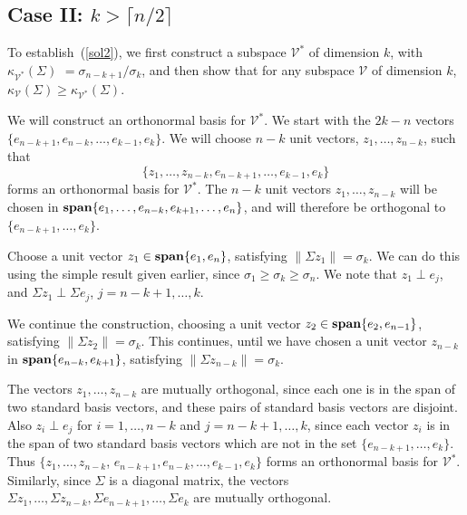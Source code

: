 \documentclass[12pt]{article}
\newcommand{\Span}{\mathop{\bf span}}%
\begin{document}
\subsection{Case II: $k > \lceil n/2 \rceil$}
To establish~(\ref{sol2}), we first construct a subspace
$\mathcal V^*$ of dimension $k$, with
$\kappa_{\mathcal V^*}(\Sigma)$ $=\sigma_{n-k+1} / \sigma_k$, and
then show that for any subspace $\mathcal V$ of dimension $k$,
$\kappa_{\mathcal V}(\Sigma) \geq \kappa_{\mathcal V^*}(\Sigma)$.

We will construct an orthonormal basis for $\mathcal V^*$. 
We start with the $2k-n$ vectors
$\{ e_{n-k+1}, e_{n-k}, \ldots, e_{k-1}, e_{k} \}$.
We will choose $n-k$ unit vectors, $z_1, \ldots, z_{n-k}$,
such that
\[
\{ z_1, \ldots, z_{n-k}, e_{n-k+1},  \ldots, e_{k-1},e_{k} \}
\] 
forms an orthonormal basis for $\mathcal V^*$. 
The $n-k$ unit vectors $z_1, \ldots, z_{n-k}$ will be chosen in
$\Span \{ e_{1}, \ldots, e_{n-k},
e_{k+1}, \ldots, e_{n} \}$, and will therefore
be orthogonal to $\{e_{n-k+1},  \ldots, e_{k} \}$.

Choose a unit vector $z_1 \in \Span\{e_1, e_n\}$, satisfying
$\|\Sigma z_1\| = \sigma_{k}$. We can do this using
the simple result given earlier, since
$\sigma_{1} \geq \sigma_{k} \geq \sigma_{n}$.
We note that $z_1 \perp e_j$,
and $\Sigma z_1 \perp  \Sigma e_j$,  $j=n-k+1, \ldots, k$.

We continue the construction, choosing a unit vector $z_2 \in
\Span\{e_2, e_{n-1}\}$,
satisfying $\| \Sigma z_2\| =\sigma_{k}$.
This continues, until we have chosen a unit vector 
$z_{n-k}$ in $\Span\{e_{n-k}, e_{k+1}\}$, satisfying
$\|\Sigma z_{n-k}\| =\sigma_{k}$.

The vectors $z_1, \ldots, z_{n-k}$ are mutually orthogonal, since each
one is in the span of two standard basis vectors, and these pairs
of standard basis vectors are disjoint.
Also $z_i \perp e_j$ for $i = 1,\ldots, n-k$ and
$j = n-k+1, \ldots, k$, since each vector $z_i$ is in the
span of two standard basis vectors which are not in the set
$\{e_{n-k+1}, \ldots, e_{k} \}$.
Thus $\{ z_1, \ldots, z_{n-k}$, $e_{n-k+1}, e_{n-k}, \ldots,
e_{k-1},e_{k} \}$ forms an orthonormal basis for $\mathcal V^*$.
Similarly, since $\Sigma$ is a diagonal matrix, the
vectors $\Sigma z_1, \ldots, \Sigma z_{n-k}, \Sigma e_{n-k+1},
\ldots, \Sigma e_{k}$ are mutually orthogonal.
\end{document}
